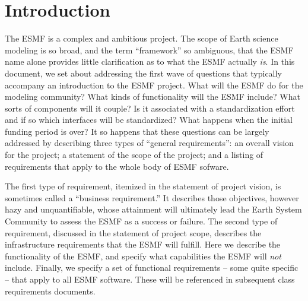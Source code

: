 \section{Introduction}
The ESMF is a complex and ambitious 
project.   The scope of Earth science modeling is so broad, and the 
term ``framework'' so ambiguous, that the ESMF name alone provides 
little clarification as to what the ESMF actually {\it is}.  In 
this document, we set about addressing the first wave of questions that 
typically accompany an introduction to the ESMF project.  What will the 
ESMF do for the modeling community?  What kinds of functionality will the ESMF 
include?  What sorts of components will it couple?  Is it associated with 
a standardization effort and if so which interfaces will be 
standardized?  What happens when the initial funding period is over?  
It so happens that these questions can be largely addressed by
describing three types of ``general requirements'': an overall vision 
for the project; a statement of the scope of the project; and a listing 
of requirements that apply to the whole body of ESMF sofware.

The first type of requirement, itemized in the statement of project vision,
is sometimes called a ``business requirement.'' \cite{wiegers}  It 
describes those objectives, however hazy and unquantifiable, whose 
attainment will ultimately lead the 
Earth System Community to assess the ESMF as a success or failure.  The second 
type of requirement, discussed in the statement of project scope, 
describes the infrastructure requirements that the ESMF will fulfill.  Here
we describe the functionality of the ESMF, and specify what capabilities 
the ESMF will {\it not} include.  Finally, we specify a set of functional 
requirements -- some quite specific -- that apply to all ESMF 
software.  These will be referenced in subsequent class requirements 
documents.





